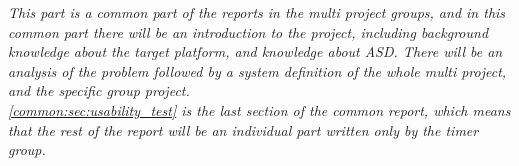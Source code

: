 \textit{This part is a common part of the reports in the multi project groups, and in this common part there will be an introduction to the project, including background knowledge about the target platform, and knowledge about ASD. There will be an analysis of the problem followed by a system definition of the whole multi project, and the specific group project.}\\

\textit{\autoref{common:sec:usability_test} is the last section of the common report, which means that the rest of the report will be an individual part written only by the timer group.}